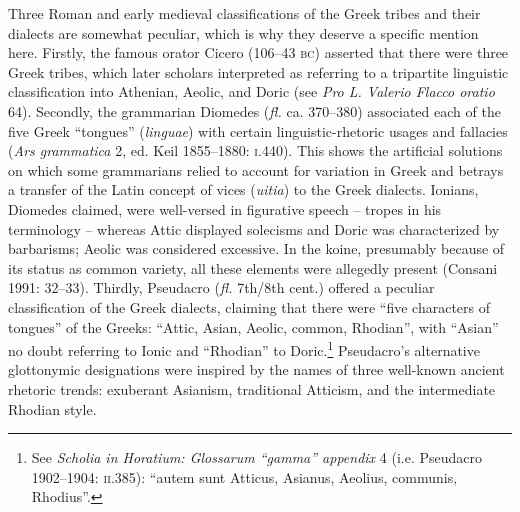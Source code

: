 \begin{styleStandard}
Three Roman and early medieval classifications of the Greek tribes and their dialects are somewhat peculiar, which is why they deserve a specific mention here. Firstly, the famous orator Cicero (106–43 \textsc{bc}) asserted that there were three Greek tribes, which later scholars interpreted as referring to a tripartite linguistic classification into Athenian, Aeolic, and Doric (see \textit{Pro L. Valerio Flacco oratio} 64). Secondly, the grammarian Diomedes (\textit{fl. }ca. 370–380) associated each of the five Greek “tongues” (\textit{linguae}) with certain linguistic-rhetoric usages and fallacies (\textit{Ars grammatica} 2, ed. Keil 1855–1880: \textsc{i}.440). This shows the artificial solutions on which some grammarians relied to account for variation in Greek and betrays a transfer of the Latin concept of vices (\textit{uitia}) to the Greek dialects. Ionians, Diomedes claimed, were well-versed in figurative speech – tropes in his terminology – whereas Attic displayed solecisms and Doric was characterized by barbarisms; Aeolic was considered excessive. In the koine, presumably because of its status as common variety, all these elements were allegedly present (Consani 1991: 32–33). Thirdly, Pseudacro (\textit{fl.} 7th/8th cent.) offered a peculiar classification of the Greek dialects, claiming that there were “five characters of tongues” of the Greeks: “Attic, Asian, Aeolic, common, Rhodian”, with “Asian” no doubt referring to Ionic and “Rhodian” to Doric.\footnote{\textrm{ See }\textrm{\textit{Scholia in Horatium: Glossarum “gamma” appendix}}\textrm{ 4 (i.e. Pseudacro 1902–1904: }\textrm{\textsc{ii.}}\textrm{385): “}autem sunt Atticus, Asianus, Aeolius, communis, Rhodius\textrm{”.}} Pseudacro’s alternative glottonymic designations were inspired by the names of three well-known ancient rhetoric trends: exuberant Asianism, traditional Atticism, and the intermediate Rhodian style.
\end{styleStandard}

